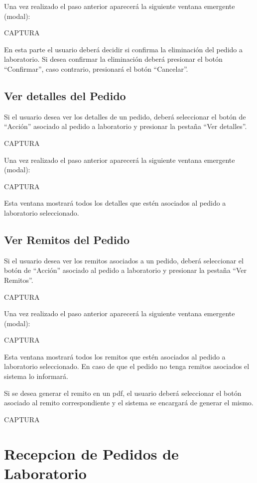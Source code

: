 \documentclass[letterpaper,10pt,spanish]{sphinxmanual}
\begin{document}
Una vez realizado el paso anterior aparecerá la siguiente ventana emergente (modal):

CAPTURA

En esta parte el usuario deberá decidir si confirma la eliminación del pedido a laboratorio. Si desea confirmar la eliminación deberá presionar el botón “Confirmar”, caso contrario, presionará el botón “Cancelar”.


\subsection{Ver detalles del Pedido}
\label{pedidosalab:ver-detalles-del-pedido}
Si el usuario desea ver los detalles de un pedido, deberá seleccionar el botón de “Acción” asociado al pedido a laboratorio y presionar la pestaña “Ver detalles”.

CAPTURA

Una vez realizado el paso anterior aparecerá la siguiente ventana emergente (modal):

CAPTURA

Esta ventana mostrará todos los detalles que estén asociados al pedido a laboratorio seleccionado.


\subsection{Ver Remitos del Pedido}
\label{pedidosalab:ver-remitos-del-pedido}
Si el usuario desea ver los remitos asociados a un pedido, deberá seleccionar el botón de “Acción” asociado al pedido a laboratorio y presionar la pestaña “Ver Remitos”.

CAPTURA

Una vez realizado el paso anterior aparecerá la siguiente ventana emergente (modal):

CAPTURA

Esta ventana mostrará todos los remitos  que estén asociados al pedido a laboratorio seleccionado.
En caso de que el pedido no tenga remitos asociados el sistema lo informará.

Si se desea generar el remito en un pdf, el usuario deberá seleccionar el botón asociado al remito correspondiente y el sistema se encargará de generar el mismo.

CAPTURA


\section{Recepcion de Pedidos de Laboratorio}
\label{receppedidosdelab::doc}\label{receppedidosdelab:recepcion-de-pedidos-de-laboratorio}
\end{document}

